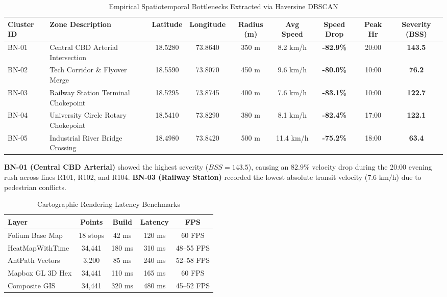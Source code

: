 \documentclass[conference]{IEEEtran}
\begin{document}
\begin{table}[t]
\caption{Empirical Spatiotemporal Bottlenecks Extracted via Haversine DBSCAN}
\centering
\begin{tabular}{@{}llccccccc@{}}
\toprule
\textbf{Cluster ID} & \textbf{Zone Description} & \textbf{Latitude} & \textbf{Longitude} & \textbf{Radius (m)} & \textbf{Avg Speed} & \textbf{Speed Drop} & \textbf{Peak Hr} & \textbf{Severity (BSS)} \\
\midrule
BN-01 & Central CBD Arterial Intersection & 18.5280 & 73.8640 & 350 m & 8.2 km/h & \textbf{-82.9\%} & 20:00 & \textbf{143.5} \\
BN-02 & Tech Corridor \& Flyover Merge & 18.5590 & 73.8070 & 450 m & 9.6 km/h & \textbf{-80.0\%} & 10:00 & \textbf{76.2} \\
BN-03 & Railway Station Terminal Chokepoint & 18.5295 & 73.8745 & 400 m & 7.6 km/h & \textbf{-83.1\%} & 10:00 & \textbf{122.7} \\
BN-04 & University Circle Rotary Chokepoint & 18.5410 & 73.8290 & 380 m & 8.1 km/h & \textbf{-82.4\%} & 17:00 & \textbf{122.1} \\
BN-05 & Industrial River Bridge Crossing & 18.4980 & 73.8420 & 500 m & 11.4 km/h & \textbf{-75.2\%} & 18:00 & \textbf{63.4} \\
\bottomrule
\end{tabular}
\label{tab:bottlenecks}
\end{table}

\textbf{BN-01 (Central CBD Arterial)} showed the highest severity ($BSS = 143.5$), causing an $82.9\%$ velocity drop during the 20:00 evening rush across lines R101, R102, and R104. \textbf{BN-03 (Railway Station)} recorded the lowest absolute transit velocity ($7.6\text{ km/h}$) due to pedestrian conflicts.

\begin{table}[h]
\caption{Cartographic Rendering Latency Benchmarks}
\centering
\begin{tabular}{@{}lcccc@{}}
\toprule
\textbf{Layer} & \textbf{Points} & \textbf{Build} & \textbf{Latency} & \textbf{FPS} \\
\midrule
Folium Base Map & 18 stops & 42 ms & 120 ms & 60 FPS \\
HeatMapWithTime & 34,441 & 180 ms & 310 ms & 48--55 FPS \\
AntPath Vectors & 3,200 & 85 ms & 240 ms & 52--58 FPS \\
Mapbox GL 3D Hex & 34,441 & 110 ms & 165 ms & 60 FPS \\
Composite GIS & 34,441 & 320 ms & 480 ms & 45--52 FPS \\
\bottomrule
\end{tabular}
\label{tab:benchmarks}
\end{table}
\end{document}
